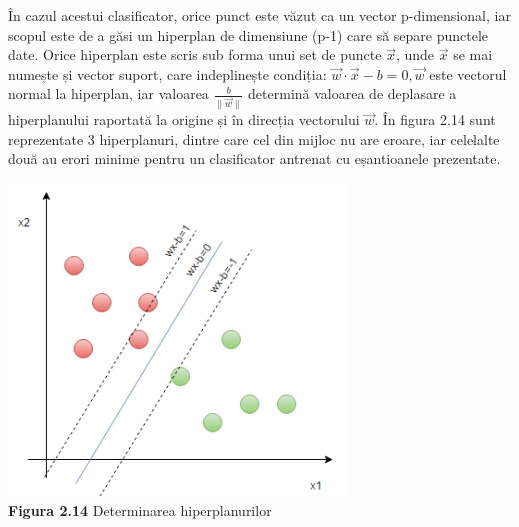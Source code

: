 \documentclass[a4paper,12pt]{report}
\newcommand\tab[1][1cm]{\hspace*{#1}}
\begin{document}
\tab În cazul acestui clasificator, orice punct este văzut ca un vector p-dimensional, iar scopul este de a găsi un hiperplan de dimensiune (p-1) care să separe punctele date. Orice hiperplan este scris sub forma unui set de puncte $\vec{x}$, unde $\vec{x}$ se mai numește și vector suport, care indeplinește condiția:
$\vec{w}\cdot \vec{x} - b = 0, \vec{w}$ este vectorul normal la hiperplan, iar valoarea $\frac{b}{\|\vec{w}\|}$ determină valoarea de deplasare a hiperplanului raportată  la origine și în direcția vectorului $\vec{w}$. În figura 2.14 sunt reprezentate 3 hiperplanuri, dintre care 
cel din mijloc nu are eroare, iar celelalte două au erori minime pentru un clasificator antrenat cu eșantioanele prezentate. 
\begin {center} 
	\begin {footnotesize} 
		\includegraphics[width = 90mm]{fig2_14} \\
		\textbf  {Figura 2.14} Determinarea hiperplanurilor
	\end {footnotesize} 
\end {center}
\end{document}
